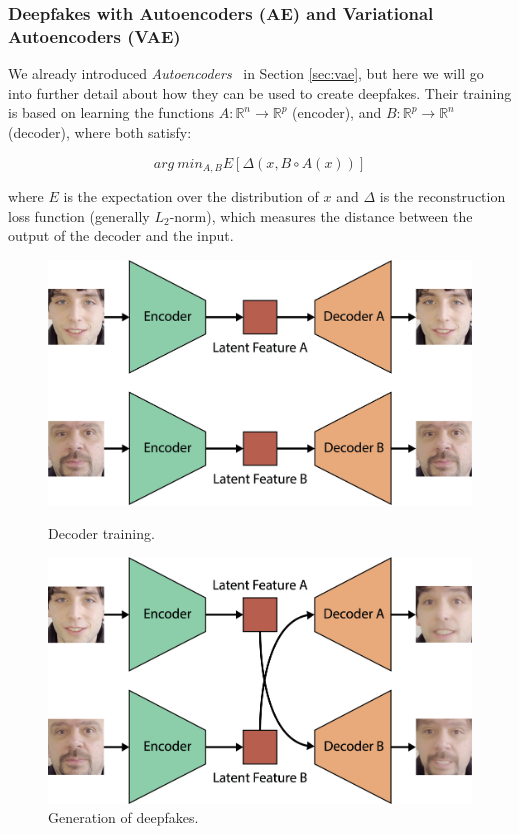 \documentclass[sn-mathphys,Numbered]{sn-jnl}
\theoremstyle{thmstyleone}%
\theoremstyle{thmstyletwo}%
\theoremstyle{thmstylethree}%
\begin{document}
\subsubsection{Deepfakes with Autoencoders (AE) and Variational Autoencoders (VAE)}\label{sec:deep-vae}

We already introduced \emph{Autoencoders}~\cite{bank2021autoencoders} in Section \ref{sec:vae}, but here we will go into further detail  about how they can be used to create deepfakes. Their training is based on learning the functions $A : \mathbb{R}^n \rightarrow \mathbb{R}^p$ (encoder), 
and $B:\mathbb{R}^p \rightarrow \mathbb{R}^n$ (decoder), where both satisfy:

\begin{equation}
	arg~min_{A,B}E[\Delta(x,B \circ A(x))]
\end{equation}

\noindent where $E$ is the expectation over the distribution of $x$ and $\Delta$ is the reconstruction loss function (generally $L_2$-norm), which measures the distance between the output of the decoder and the input.



\begin{figure}[t]
	\centering
    \includegraphics[scale=0.6, keepaspectratio]{img/background_img/Training-AE.png}
    \caption{Decoder training.}\label{fig:training-ae}
	\includegraphics[scale=0.6, keepaspectratio]{img/background_img/Generation-AE2.png}
	\caption{Generation of deepfakes.}\label{fig:generation-ae}
\end{figure}
\end{document}
